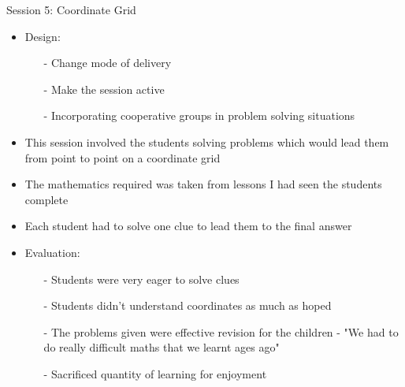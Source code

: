 \documentclass{beamer}  %
\begin{document}
\begin{frame}{Session 5: Coordinate Grid}
    \begin{itemize}
        \item Design:
        \begin{itemize}
            \item[-] Change mode of delivery 
            \item[-] Make the session active
            \item[-] Incorporating cooperative groups in problem solving situations 
        \end{itemize}
        \item This session involved the students solving problems which would lead them from point to point on a coordinate grid
        \item The mathematics required was taken from lessons I had seen the students complete
        \item Each student had to solve one clue to lead them to the final answer
        \item Evaluation:
        \begin{itemize}
            \item[-] Students were very eager to solve clues
            \item[-] Students didn't understand coordinates as much as hoped
            \item[-] The problems given were effective revision for the children - "We had to do really difficult maths that we learnt ages ago"
            \item[-] Sacrificed quantity of learning for enjoyment
        \end{itemize}
    \end{itemize}
\end{frame}
\end{document}
